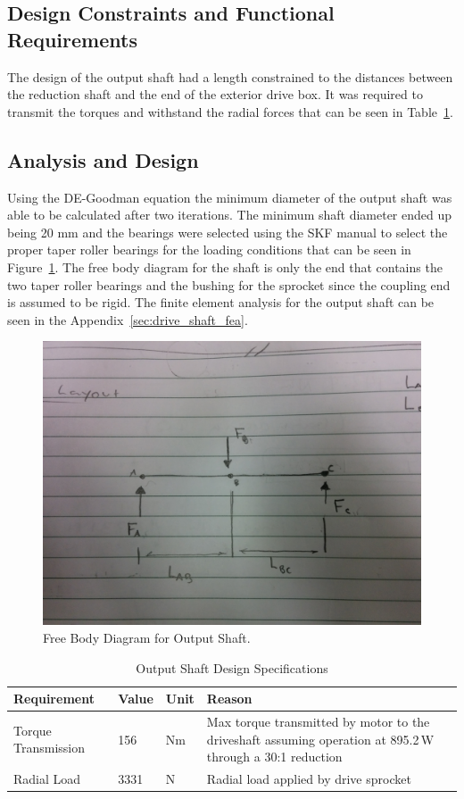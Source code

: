 \subsection{Design Constraints and Functional Requirements}
The design of the output shaft had a length constrained to the distances between the reduction shaft and the end of the exterior drive box. It was required to transmit the torques and withstand the radial forces that can be seen in Table~\ref{tab:output_shaft_specs}.   

\subsection{Analysis and Design}
Using the DE-Goodman equation the minimum diameter of the output shaft was able to be calculated after two iterations. The minimum shaft diameter ended up being 20 mm and the bearings were selected using the SKF manual to select the proper taper roller bearings for the loading conditions that can be seen in Figure~\ref{fig:fb_output_shaft}. The free body diagram for the shaft is only the end that contains the two taper roller bearings and the bushing for the sprocket since the coupling end is assumed to be rigid. The finite element analysis for the output shaft can be seen in the Appendix~\ref{sec:drive_shaft_fea}.
\begin{figure}[H]
	\includegraphics[width=\linewidth]{images/fb_output_shaft.jpg}
	\caption{Free Body Diagram for Output Shaft.}
	\label{fig:fb_output_shaft}
\end{figure}
\begin{table}[H]
	\centering
	\caption{Output Shaft Design Specifications}
	\begin{tabular}{| p{5cm}llp{7cm} |} \hline
		Requirement & Value & Unit & Reason \\ \hline
		Torque Transmission & 156 & Nm & Max torque transmitted by motor to the driveshaft assuming operation at 895.2\,W through a 30:1 reduction \\
		Radial Load & 3331	& N & Radial load applied by drive sprocket \\ \hline
	\end{tabular}
	\label{tab:output_shaft_specs}
\end{table}

